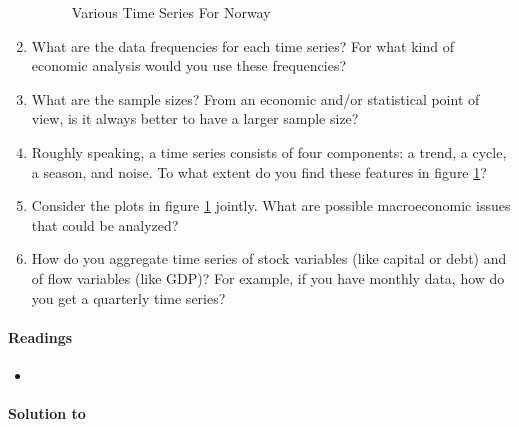\begin{enumerate}
\begin{figure}[htbp]
		\caption{Various Time Series For Norway}
		\label{fig:NorwayData}
		\end{figure}
   \item What are the data frequencies for each time series?
   For what kind of economic analysis would you use these frequencies?
   \item What are the sample sizes?
   From an economic and/or statistical point of view, is it always better to have a larger sample size?
   \item Roughly speaking, a time series consists of four components: a trend, a cycle, a season, and noise.
   To what extent do you find these features in figure \ref{fig:NorwayData}?
   \item Consider the plots in figure \ref{fig:NorwayData} jointly.
   What are possible macroeconomic issues that could be analyzed?
   \item How do you aggregate time series of stock variables (like capital or debt) and of flow variables (like GDP)?
   For example, if you have monthly data, how do you get a quarterly time series?
\end{enumerate}

\paragraph{Readings}
\begin{itemize}
   \item \textcite[Ch.1, Ch.2]{Bjornland.Thorsrud_2015_AppliedTimeSeries}
\end{itemize}

\begin{solution}\textbf{Solution to }
\ifDisplaySolutions

\fi
\newpage
\end{solution}